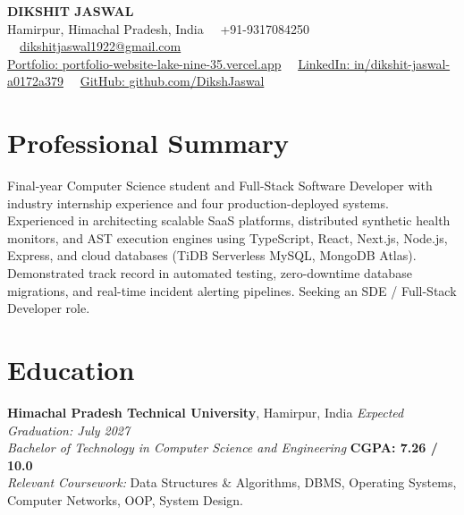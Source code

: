 \documentclass[a4paper,10pt]{article}
\begin{document}
\begin{center}
    {\LARGE \textbf{DIKSHIT JASWAL}}\\[1.5pt]
    Hamirpur, Himachal Pradesh, India \ \textbar \ +91-9317084250 \ \textbar \ \href{mailto:dikshitjaswal1922@gmail.com}{dikshitjaswal1922@gmail.com}\\[1.5pt]
    \href{https://portfolio-website-lake-nine-35.vercel.app/}{Portfolio: portfolio-website-lake-nine-35.vercel.app} \ \textbar \ \href{https://linkedin.com/in/dikshit-jaswal-a0172a379}{LinkedIn: in/dikshit-jaswal-a0172a379} \ \textbar \ \href{https://github.com/DikshJaswal}{GitHub: github.com/DikshJaswal}
\end{center}

\section*{Professional Summary}
Final-year Computer Science student and Full-Stack Software Developer with industry internship experience and four production-deployed systems. Experienced in architecting scalable SaaS platforms, distributed synthetic health monitors, and AST execution engines using TypeScript, React, Next.js, Node.js, Express, and cloud databases (TiDB Serverless MySQL, MongoDB Atlas). Demonstrated track record in automated testing, zero-downtime database migrations, and real-time incident alerting pipelines. Seeking an SDE / Full-Stack Developer role.

\section*{Education}
\textbf{Himachal Pradesh Technical University}, Hamirpur, India \hfill \textit{Expected Graduation: July 2027}\\
\textit{Bachelor of Technology in Computer Science and Engineering} \hfill \textbf{CGPA: 7.26 / 10.0}\\
\textit{Relevant Coursework:} Data Structures \& Algorithms, DBMS, Operating Systems, Computer Networks, OOP, System Design.

\end{document}
